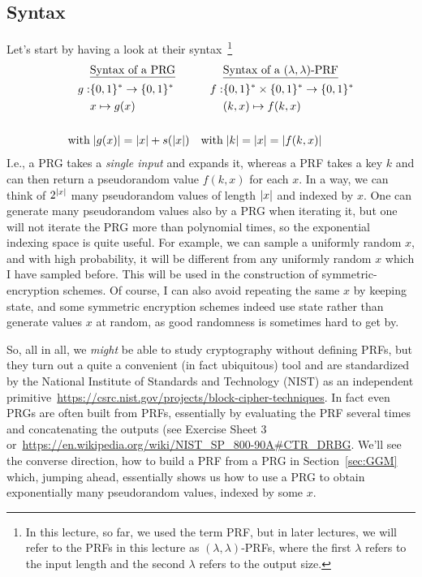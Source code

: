 \documentclass[a4paper,table,dvipsnames]{article}
\theoremstyle{definition}
\begin{document}
\subsection{Syntax}
Let's start by having a look at their syntax~\footnote{In this lecture,
so far, we used the term PRF, but in later lectures, we will refer to the PRFs in this lecture as $(\lambda,\lambda)$-PRFs,
where the first $\lambda$ refers to the input length and the second $\lambda$ refers to the output size.}
\begin{align*}
  &\underline{\text{Syntax of a PRG}}& &\underline{\text{Syntax of a }(\lambda,\lambda)\text{-PRF}}\\
g:&\bin^*\rightarrow\bin^* &  f:&\bin^*\times\bin^*\rightarrow\bin^* \\
  &x\mapsto g(x) &             &(k,x)\mapsto f(k,x) \\
	&&&\\
	\text{with}&\;\abs{g(x)}=\abs{x}+s(\abs{x}) & \text{with}&\;\abs{k}=\abs{x}=\abs{f(k,x)}
\end{align*}
I.e., a PRG takes a \emph{single input} and expands it, whereas a PRF takes a key $k$ and can then
return a pseudorandom value $f(k,x)$ for each $x$. In a way, we can think of $2^{\left\lvert x\right\rvert}$ many
pseudorandom values of length $\left\lvert x\right\rvert$ and indexed by $x$. One can generate many pseudorandom
values also by a PRG when iterating it, but one will not iterate the PRG more than polynomial times, 
so the exponential indexing space is quite useful. For example, we can sample a uniformly random
$x$, and with high probability, it will be different from any uniformly random $x$ which I have sampled
before. This will be used in the construction of symmetric-encryption schemes. Of course, I can also
avoid repeating the same $x$ by keeping state, and some symmetric encryption schemes indeed use
 state rather than generate values $x$ at random, as good randomness is sometimes hard to get by.

So, all in all, we \emph{might} be able to study cryptography without defining PRFs, but they
turn out a quite a convenient (in fact ubiquitous) tool and are standardized by the National Institute of Standards and Technology (NIST)
as an independent primitive~\url{https://csrc.nist.gov/projects/block-cipher-techniques}.
 In fact even PRGs are often built from PRFs, essentially by evaluating
the PRF several times and concatenating the outputs (see Exercise Sheet 3
or~\url{https://en.wikipedia.org/wiki/NIST_SP_800-90A#CTR_DRBG}. We'll see
the converse direction, how to build a PRF from a PRG in Section~\ref{sec:GGM}
which, jumping ahead, essentially shows us how to use a PRG to obtain exponentially 
many pseudorandom values, indexed by some $x$.
\end{document}

